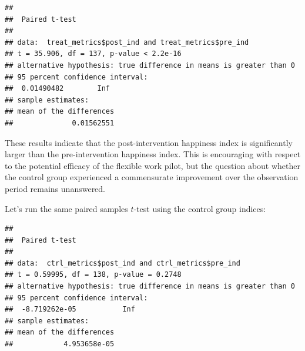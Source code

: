 \documentclass[]{book}
\newenvironment{Shaded}{\begin{snugshade}}{\end{snugshade}}
\newcommand{\CommentTok}[1]{\textcolor[rgb]{0.56,0.35,0.01}{\textit{#1}}}
\newcommand{\DataTypeTok}[1]{\textcolor[rgb]{0.13,0.29,0.53}{#1}}
\newcommand{\KeywordTok}[1]{\textcolor[rgb]{0.13,0.29,0.53}{\textbf{#1}}}
\newcommand{\NormalTok}[1]{#1}
\newcommand{\OperatorTok}[1]{\textcolor[rgb]{0.81,0.36,0.00}{\textbf{#1}}}
\newcommand{\OtherTok}[1]{\textcolor[rgb]{0.56,0.35,0.01}{#1}}
\newcommand{\StringTok}[1]{\textcolor[rgb]{0.31,0.60,0.02}{#1}}
\begin{document}
\begin{Shaded}
\end{Shaded}

\begin{verbatim}
## 
##  Paired t-test
## 
## data:  treat_metrics$post_ind and treat_metrics$pre_ind
## t = 35.906, df = 137, p-value < 2.2e-16
## alternative hypothesis: true difference in means is greater than 0
## 95 percent confidence interval:
##  0.01490482        Inf
## sample estimates:
## mean of the differences 
##              0.01562551
\end{verbatim}

These results indicate that the post-intervention happiness index is significantly larger than the pre-intervention happiness index. This is encouraging with respect to the potential efficacy of the flexible work pilot, but the question about whether the control group experienced a commensurate improvement over the observation period remains unanswered.

Let's run the same paired samples \(t\)-test using the control group indices:

\begin{Shaded}
\end{Shaded}

\begin{verbatim}
## 
##  Paired t-test
## 
## data:  ctrl_metrics$post_ind and ctrl_metrics$pre_ind
## t = 0.59995, df = 138, p-value = 0.2748
## alternative hypothesis: true difference in means is greater than 0
## 95 percent confidence interval:
##  -8.719262e-05           Inf
## sample estimates:
## mean of the differences 
##            4.953658e-05
\end{verbatim}
\end{document}
